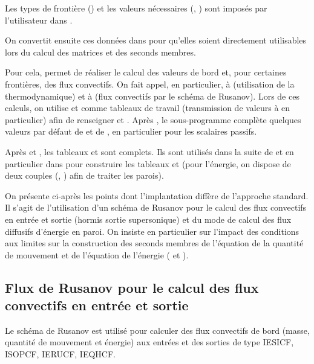 \bigskip
Les types de frontière () et les valeurs nécessaires
(, ) sont imposés par l'utilisateur dans .

On convertit ensuite ces données dans  pour qu'elles
soient directement utilisables lors du calcul des matrices et des seconds membres.

Pour cela,  permet de réaliser le calcul des valeurs de bord et,
pour certaines frontières, des flux convectifs. On fait appel,
en particulier,
à  (utilisation de la thermodynamique) et à 
(flux convectifs par le schéma de Rusanov). Lors de ces calculs, on utilise
 et  comme tableaux de travail (transmission de valeurs
à  en particulier) afin de renseigner  et
.
Après ,
le sous-programme  complète quelques valeurs par défaut
de  et de , en particulier pour les scalaires passifs.

Après  et , les tableaux  et 
sont complets. Ils sont utilisés dans la suite de  et en particulier
dans  pour construire les tableaux  et 
(pour l'énergie, on dispose de deux couples (, ) afin de
traiter les parois).

On présente ci-après les points dont l'implantation diffère
de l'approche standard. Il s'agit de
l'utilisation d'un schéma de Rusanov pour le calcul des flux convectifs
en entrée et sortie (hormis sortie supersonique)
et du mode de calcul des flux diffusifs d'énergie en paroi.
On insiste en particulier sur l'impact des conditions aux limites
sur la construction des seconds membres de l'équation de la quantité
de mouvement et de l'équation de l'énergie ( et ).

\subsection*{Flux de Rusanov pour le calcul des flux convectifs en entrée et sortie}

Le schéma de Rusanov est utilisé pour calculer des flux convectifs de bord
(masse, quantité de mouvement et énergie) aux entrées et des sorties
de type IESICF, ISOPCF, IERUCF, IEQHCF.

